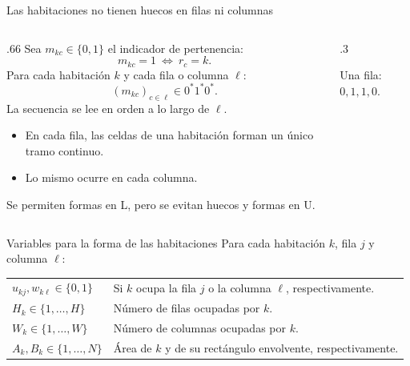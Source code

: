 \documentclass[aspectratio=169,11pt]{beamer}
\newcommand{\examplegrid}{%
  \draw[step=1,ink!35] (0,0) grid (4,4);
  \draw[ink,thick] (0,0) rectangle (4,4);
}
\begin{document}
\begin{frame}{Las habitaciones no tienen huecos en filas ni columnas}
  \begin{columns}[T,onlytextwidth]
  \begin{column}{.66\textwidth}
  \small
  Sea \(m_{kc}\in\{0,1\}\) el indicador de pertenencia:
  \[
    m_{kc}=1\ \Longleftrightarrow\ r_c=k.
  \]
  Para cada habitaci\'on \(k\) y cada fila o columna \(\ell\):
  \[
    (m_{kc})_{c\in\ell}\in 0^*1^*0^*.
  \]
  \small La secuencia se lee en orden a lo largo de \(\ell\).
  \begin{itemize}
    \setlength{\itemsep}{2mm}
    \item En cada fila, las celdas de una habitaci\'on forman
      un \'unico tramo continuo.
    \item Lo mismo ocurre en cada columna.
  \end{itemize}
  Se permiten formas en L, pero se evitan huecos y formas en U.
  \end{column}
  \begin{column}{.3\textwidth}
    \centering
    \par\smallskip\scriptsize Una fila: \(0,1,1,0\).
  \end{column}
  \end{columns}
\end{frame}

\begin{frame}{Variables para la forma de las habitaciones}
  \small
  Para cada habitaci\'on \(k\), fila \(j\) y columna \(\ell\):
  \medskip

  \renewcommand{\arraystretch}{1.2}
  \begin{tabular}{@{}l p{}@{}}
    \(u_{kj},w_{k\ell}\in\{0,1\}\) &
      Si \(k\) ocupa la fila \(j\) o la columna \(\ell\), respectivamente.\\
    \(H_k\in\{1,\ldots,H\}\) & N\'umero de filas ocupadas por \(k\).\\
    \(W_k\in\{1,\ldots,W\}\) & N\'umero de columnas ocupadas por \(k\).\\
    \(A_k,B_k\in\{1,\ldots,N\}\) &
      \'Area de \(k\) y de su rect\'angulo envolvente, respectivamente.\\
  \end{tabular}
\end{frame}
\end{document}

